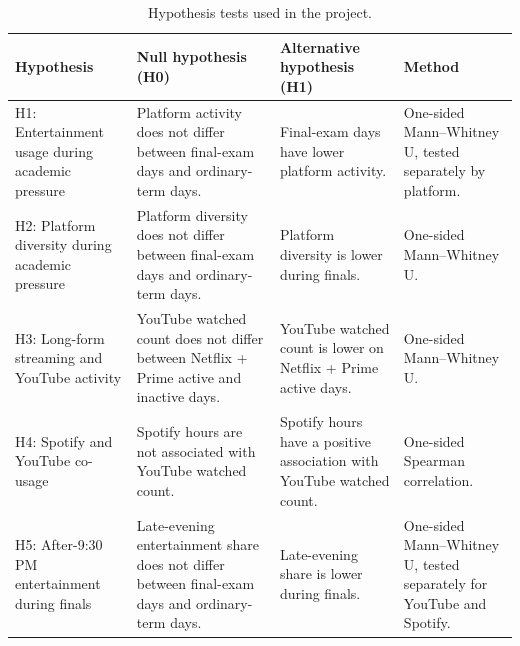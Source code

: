 \documentclass[11pt,a4paper]{article}
\begin{document}
\begin{table}[H]
\centering
\scriptsize
\caption{Hypothesis tests used in the project.}
\label{tab:hypotheses}
\begin{tabularx}{\textwidth}{p{} X X p{}}
\toprule
\textbf{Hypothesis} & \textbf{Null hypothesis (H0)} & \textbf{Alternative hypothesis (H1)} & \textbf{Method}\\
\midrule
H1: Entertainment usage during academic pressure & Platform activity does not differ between final-exam days and ordinary-term days. & Final-exam days have lower platform activity. & One-sided Mann--Whitney U, tested separately by platform.\\
H2: Platform diversity during academic pressure & Platform diversity does not differ between final-exam days and ordinary-term days. & Platform diversity is lower during finals. & One-sided Mann--Whitney U.\\
H3: Long-form streaming and YouTube activity & YouTube watched count does not differ between Netflix + Prime active and inactive days. & YouTube watched count is lower on Netflix + Prime active days. & One-sided Mann--Whitney U.\\
H4: Spotify and YouTube co-usage & Spotify hours are not associated with YouTube watched count. & Spotify hours have a positive association with YouTube watched count. & One-sided Spearman correlation.\\
H5: After-9:30 PM entertainment during finals & Late-evening entertainment share does not differ between final-exam days and ordinary-term days. & Late-evening share is lower during finals. & One-sided Mann--Whitney U, tested separately for YouTube and Spotify.\\
\bottomrule
\end{tabularx}
\end{table}
\end{document}
